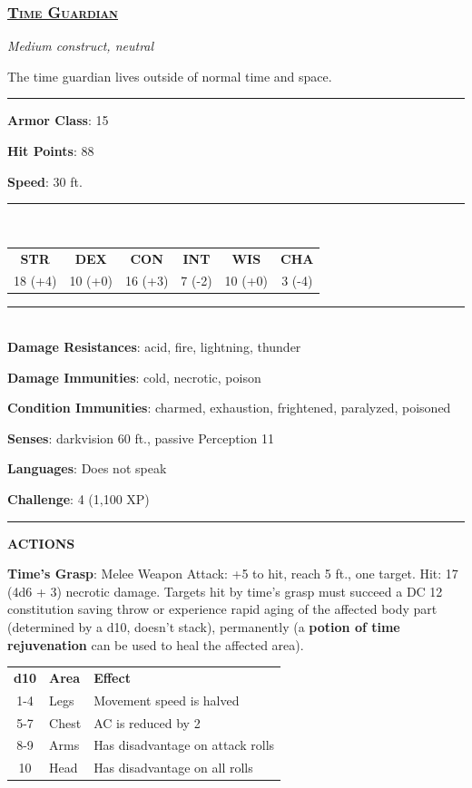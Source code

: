 \subsubsection*{\underline{\textsc{\Large Time Guardian}}}
\noindent\emph{Medium construct, neutral}

The time guardian lives outside of normal time and space.

\noindent\rule{0.5\textwidth}{0.5pt}

\noindent\textbf{Armor Class}: 15

\noindent\textbf{Hit Points}: 88

\noindent\textbf{Speed}: 30 ft.

\noindent\rule{0.5\textwidth}{0.5pt} \\
\begin{table}[H]
	\begin{tabular}{cccccc}
		\textbf{STR} & \textbf{DEX} & \textbf{CON} & \textbf{INT} & \textbf{WIS} & \textbf{CHA} \\
		18 (+4) & 10 (+0) & 16 (+3) & 7 (-2) & 10 (+0) & 3 (-4) \\
	\end{tabular}
\end{table}
\noindent\rule{0.5\textwidth}{0.5pt} \\

\noindent\textbf{Damage Resistances}: acid, fire, lightning, thunder

\noindent\textbf{Damage Immunities}: cold, necrotic, poison

\noindent\textbf{Condition Immunities}: charmed, exhaustion, frightened, paralyzed, poisoned

\noindent\textbf{Senses}: darkvision 60 ft., passive Perception 11

\noindent\textbf{Languages}: Does not speak

\noindent\textbf{Challenge}: 4 (1,100 XP)

\noindent\rule{0.5\textwidth}{0.5pt}

\noindent\textbf{ACTIONS}

\noindent\textbf{Time's Grasp}: Melee Weapon Attack: +5 to hit, reach 5 ft., one target. Hit: 17 (4d6 + 3) necrotic damage. Targets hit by time's grasp must succeed a DC 12 constitution saving throw or experience rapid aging of the affected body part (determined by a d10, doesn't stack), permanently (a \textbf{potion of time rejuvenation} can be used to heal the affected area).

\begin{table}[H]
	\begin{tabular}{cll}
		\textbf{d10} & \textbf{Area} & \textbf{Effect} \\
		1-4 & Legs & Movement speed is halved \\
		5-7 & Chest & AC is reduced by 2 \\
		8-9 & Arms & Has disadvantage on attack rolls \\
		10 & Head & Has disadvantage on all rolls \\
	\end{tabular}
\end{table} 

